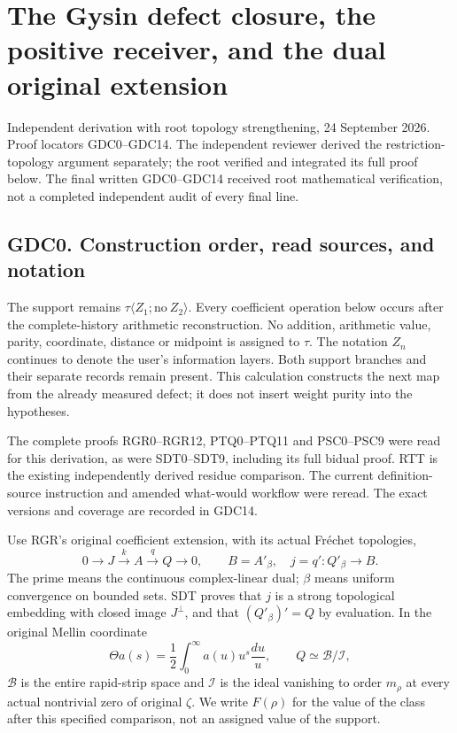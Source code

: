 \section{The Gysin defect closure, the positive receiver, and the dual
original
extension}\label{the-gysin-defect-closure-the-positive-receiver-and-the-dual-original-extension}

Independent derivation with root topology strengthening, 24 September
2026. Proof locators GDC0--GDC14. The independent reviewer derived the
restriction-topology argument separately; the root verified and
integrated its full proof below. The final written GDC0--GDC14 received
root mathematical verification, not a completed independent audit of
every final line.

\subsection{GDC0. Construction order, read sources, and
notation}\label{gdc0.-construction-order-read-sources-and-notation}

The support remains \(\tau\langle Z_1;\mathrm{no}\ Z_2\rangle\). Every
coefficient operation below occurs after the complete-history arithmetic
reconstruction. No addition, arithmetic value, parity, coordinate,
distance or midpoint is assigned to \(\tau\). The notation \(Z_n\)
continues to denote the user's information layers. Both support branches
and their separate records remain present. This calculation constructs
the next map from the already measured defect; it does not insert weight
purity into the hypotheses.

The complete proofs RGR0--RGR12, PTQ0--PTQ11 and PSC0--PSC9 were read
for this derivation, as were SDT0--SDT9, including its full bidual
proof. RTT is the existing independently derived residue comparison. The
current definition-source instruction and amended what-would workflow
were reread. The exact versions and coverage are recorded in GDC14.

Use RGR's original coefficient extension, with its actual Fréchet
topologies, \[
0\longrightarrow J\xrightarrow{k}A\xrightarrow{q}Q\longrightarrow0,
\qquad B=A'_\beta,\quad j=q':Q'_\beta\longrightarrow B.
\tag{GDC0.1}
\] The prime means the continuous complex-linear dual; \(\beta\) means
uniform convergence on bounded sets. SDT proves that \(j\) is a strong
topological embedding with closed image \(J^\perp\), and that
\((Q'_\beta)'=Q\) by evaluation. In the original Mellin coordinate \[
\Theta a(s)=\frac12\int_0^\infty a(u)u^s\frac{du}{u},
\qquad Q\simeq\mathcal B/\mathcal I,
\tag{GDC0.2}
\] \(\mathcal B\) is the entire rapid-strip space and \(\mathcal I\) is
the ideal vanishing to order \(m_\rho\) at every actual nontrivial zero
of original \(\zeta\). We write \(F(\rho)\) for the value of the class
after this specified comparison, not an assigned value of the support.

